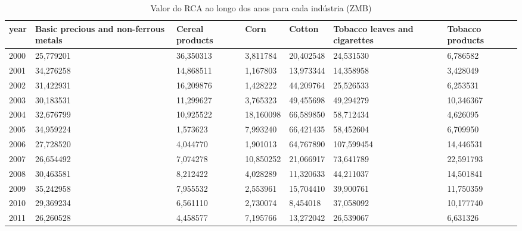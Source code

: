 \begin{table}
\centering
\caption{Valor do RCA ao longo dos anos para cada indústria (ZMB)}
\begin{tabular}{p{1cm}p{2cm}p{2cm}p{2cm}p{2cm}p{2cm}p{2cm}}
\toprule
 year &  Basic precious and non-ferrous metals &  Cereal products &      Corn &    Cotton &  Tobacco leaves and cigarettes &  Tobacco products \\
\midrule
 2000 &                              25,779201 &        36,350313 &  3,811784 & 20,402548 &                      24,531530 &          6,786582 \\
 2001 &                              34,276258 &        14,868511 &  1,167803 & 13,973344 &                      14,358958 &          3,428049 \\
 2002 &                              31,422931 &        16,209876 &  1,428222 & 44,209764 &                      25,526533 &          6,253531 \\
 2003 &                              30,183531 &        11,299627 &  3,765323 & 49,455698 &                      49,294279 &         10,346367 \\
 2004 &                              32,676799 &        10,925522 & 18,160098 & 66,589850 &                      58,712434 &          4,626095 \\
 2005 &                              34,959224 &         1,573623 &  7,993240 & 66,421435 &                      58,452604 &          6,709950 \\
 2006 &                              27,728520 &         4,044770 &  1,901013 & 64,767890 &                     107,599454 &         14,446531 \\
 2007 &                              26,654492 &         7,074278 & 10,850252 & 21,066917 &                      73,641789 &         22,591793 \\
 2008 &                              30,463581 &         8,212422 &  4,028289 & 11,320633 &                      44,211037 &         14,501841 \\
 2009 &                              35,242958 &         7,955532 &  2,553961 & 15,704410 &                      39,900761 &         11,750359 \\
 2010 &                              29,369234 &         6,561110 &  2,730074 &  8,454018 &                      37,058092 &         10,177740 \\
 2011 &                              26,260528 &         4,458577 &  7,195766 & 13,272042 &                      26,539067 &          6,631326 \\

\end{tabular}
\end{table}
